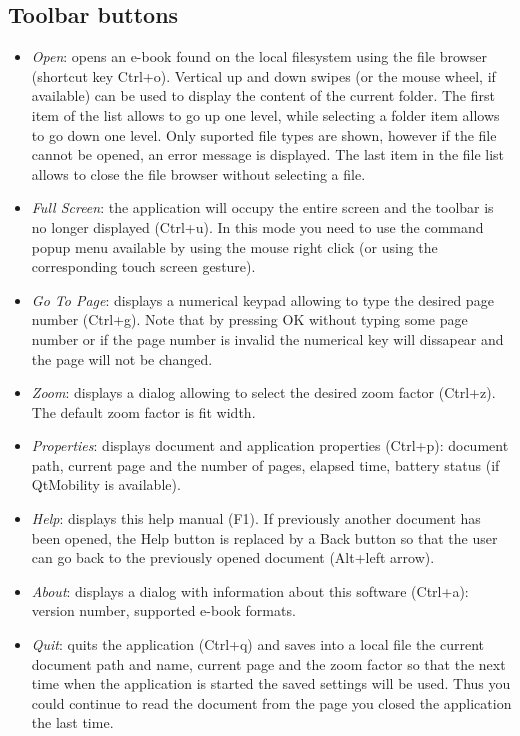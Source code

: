 \documentclass[journal,12pt]{IEEEtran}
\begin{document}
\subsection{Toolbar buttons}
\begin{itemize}
 \item \textit{Open}: opens an e-book found on the local filesystem using the file browser (shortcut key Ctrl+o). Vertical up and down swipes (or the mouse wheel, if available) can be used to display the content of the current folder. The first item of the list allows to go up one level, while selecting a folder item allows to go down one level. Only suported file types are shown, however if the file cannot be opened, an error message is displayed. The last item in the file list allows to close the file browser without selecting a file.
 \item \textit{Full Screen}: the application will occupy the entire screen and the toolbar is no longer displayed (Ctrl+u). In this mode you need to use the command popup menu available by using the mouse right click (or using the corresponding touch screen gesture).
 \item \textit{Go To Page}: displays a numerical keypad allowing to type the desired page number (Ctrl+g). Note that by pressing OK without typing some page number or if the page number is invalid the numerical key will dissapear and the page will not be changed.
 \item \textit{Zoom}: displays a dialog allowing to select the desired zoom factor (Ctrl+z). The default zoom factor is fit width.
 \item \textit{Properties}: displays document and application properties (Ctrl+p): document path, current page and the number of pages, elapsed time, battery status (if QtMobility is available).
 \item \textit{Help}: displays this help manual (F1). If previously another document has been opened, the Help button is replaced by a Back button so that the user can go back to the previously opened document (Alt+left arrow).
 \item \textit{About}: displays a dialog with information about this software (Ctrl+a): version number, supported e-book formats.
 \item \textit{Quit}: quits the application (Ctrl+q) and saves into a local file the current document path and name, current page and the  zoom factor so that the next time when the application is started the saved settings will be used. Thus you could continue to read the document from the page you closed the application the last time.
\end{itemize}
\end{document}
